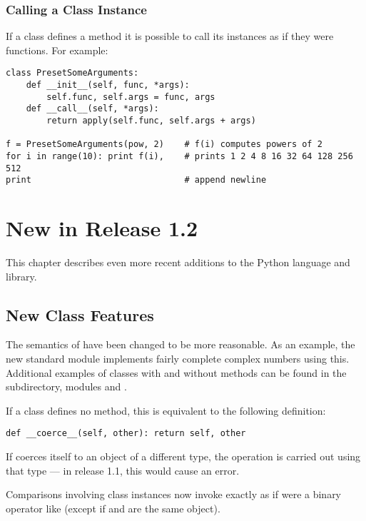 \subsection{Calling a Class Instance}

If a class defines a method  it is possible to call its
instances as if they were functions.  For example:

\begin{verbatim}
class PresetSomeArguments:
    def __init__(self, func, *args):
        self.func, self.args = func, args
    def __call__(self, *args):
        return apply(self.func, self.args + args)

f = PresetSomeArguments(pow, 2)    # f(i) computes powers of 2
for i in range(10): print f(i),    # prints 1 2 4 8 16 32 64 128 256 512
print                              # append newline
\end{verbatim}


\chapter{New in Release 1.2}


This chapter describes even more recent additions to the Python
language and library.


\section{New Class Features}

The semantics of  have been changed to be more
reasonable.  As an example, the new standard module 
implements fairly complete complex numbers using this.  Additional
examples of classes with and without  methods can be
found in the  subdirectory, modules  and
.

If a class defines no  method, this is equivalent to
the following definition:

\begin{verbatim}
def __coerce__(self, other): return self, other
\end{verbatim}

If  coerces itself to an object of a different type,
the operation is carried out using that type --- in release 1.1, this
would cause an error.

Comparisons involving class instances now invoke 
exactly as if  were a binary operator like \code{+}
(except if  and  are the same object).

